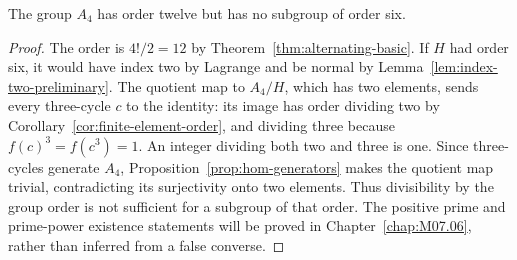 \begin{example}\label{ex:A4-no-six}
The group $A_4$ has order twelve but has no subgroup of order six.
\end{example}
\begin{proof}
The order is $4!/2=12$ by Theorem~\ref{thm:alternating-basic}. If $H$ had order six, it would have index two by Lagrange and be normal by Lemma~\ref{lem:index-two-preliminary}. The quotient map to $A_4/H$, which has two elements, sends every three-cycle $c$ to the identity: its image has order dividing two by Corollary~\ref{cor:finite-element-order}, and dividing three because $f(c)^3=f(c^3)=1$. An integer dividing both two and three is one. Since three-cycles generate $A_4$, Proposition~\ref{prop:hom-generators} makes the quotient map trivial, contradicting its surjectivity onto two elements. Thus divisibility by the group order is not sufficient for a subgroup of that order. The positive prime and prime-power existence statements will be proved in Chapter~\ref{chap:M07.06}, rather than inferred from a false converse.
\end{proof}
